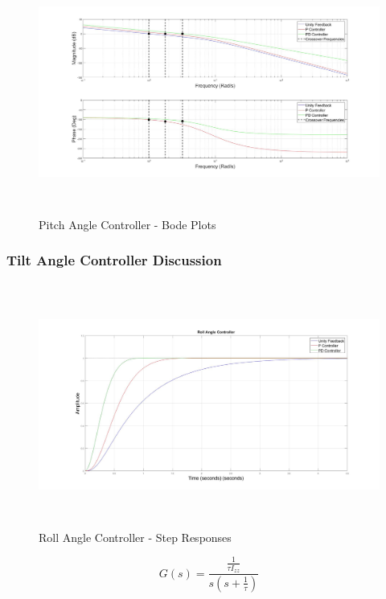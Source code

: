\documentclass[12pt]{report}
\begin{document}
\begin{figure}[H]
	\centering
	\includegraphics[height = 8cm]{../Design/Matlab/Controllers/pitch_angle_bode.jpg}
	\caption{Pitch Angle Controller -  Bode Plots}
	\label{IM_PitchAngleControlBode}
\end{figure}

\subsubsection{Tilt Angle Controller Discussion}

\begin{figure}[H]
	\centering
	\includegraphics[height = 8cm]{../Design/Matlab/Controllers/roll_angle_step.jpg}
	\caption{Roll Angle Controller -  Step Responses}
	\label{IM_RollAngleStep}
\end{figure}

\begin{equation}
\label{EQ_RollAngleTF}
G(s) = \frac{\frac{1}{\tau I_{zz}}}{s (s + \frac{1}{\tau})}
\end{equation}
\end{document}
